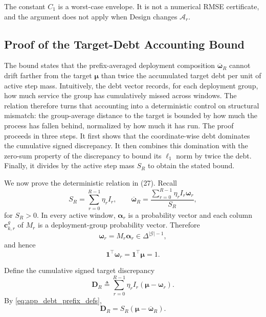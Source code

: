 The constant $C_1$ is a worst-case envelope.  It is not a numerical
RMSE certificate, and the argument does not apply when Design changes
$\mathcal{A}_r$.


\subsection{Proof of the Target-Debt Accounting Bound}
\label{app:proof_debt_bound}

The bound states that the prefix-averaged deployment composition
$\overline{\boldsymbol\omega}_R$ cannot drift farther from the target
$\boldsymbol\mu$ than twice the accumulated target debt per unit of active
step mass.  Intuitively, the debt vector records, for each deployment group,
how much service the group has cumulatively missed across windows.  The
relation therefore turns that accounting into a deterministic control on
structural mismatch: the group-average distance to the target is bounded by
how much the process has fallen behind, normalized by how much it has run.
The proof proceeds in three steps.  It first shows that the coordinate-wise
debt dominates the cumulative signed discrepancy.  It then combines this
domination with the zero-sum property of the discrepancy to bound its
$\ell_1$ norm by twice the debt.  Finally, it divides by the active step
mass $S_R$ to obtain the stated bound.

We now prove the deterministic relation in
(27).  Recall
\begin{equation}
    S_R
    =
    \sum_{r=0}^{R-1}\eta_rI_r,
    \qquad
    \overline{\boldsymbol\omega}_R
    =
    \frac{
    \sum_{r=0}^{R-1}
    \eta_rI_r\boldsymbol\omega_r
    }{S_R},
    \label{eq:app_debt_prefix_defs}
\end{equation}
for $S_R>0$.  In every active window,
$\boldsymbol\alpha_r$ is a probability vector and each column
$\mathbf{c}_{k,r}^{g}$ of $M_r$ is a deployment-group probability vector.
Therefore
\begin{equation}
    \boldsymbol\omega_r
    =
    M_r\boldsymbol\alpha_r
    \in
    \Delta^{|\mathcal G|-1},
    \label{eq:app_omega_simplex}
\end{equation}
and hence
\begin{equation}
    \mathbf{1}^{\top}\boldsymbol\omega_r
    =
    \mathbf{1}^{\top}\boldsymbol\mu
    =1.
    \label{eq:app_equal_mass}
\end{equation}

Define the cumulative signed target discrepancy
\begin{equation}
    \mathbf{D}_R
    \triangleq
    \sum_{r=0}^{R-1}
    \eta_rI_r
    \left(
    \boldsymbol\mu-\boldsymbol\omega_r
    \right).
    \label{eq:app_DR}
\end{equation}
By \eqref{eq:app_debt_prefix_defs},
\begin{equation}
    \mathbf{D}_R
    =
    S_R
    \left(
    \boldsymbol\mu-\overline{\boldsymbol\omega}_R
    \right).
    \label{eq:app_DR_baromega}
\end{equation}

